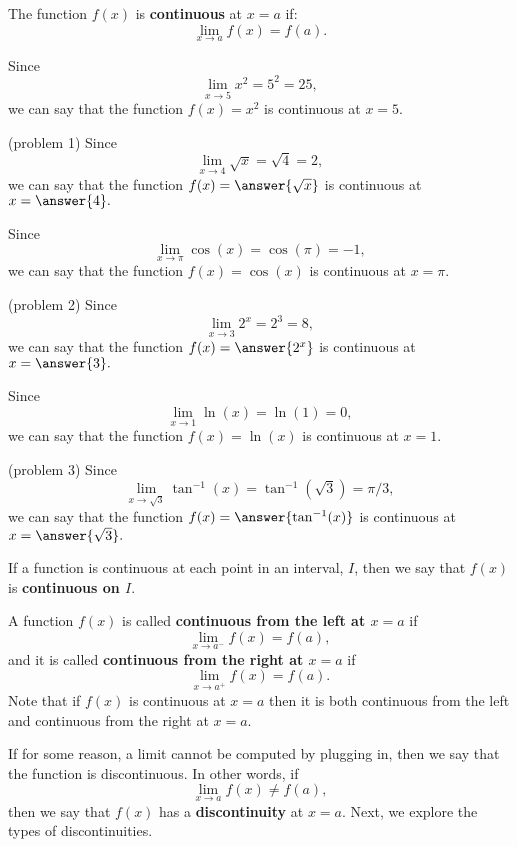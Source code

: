 \documentclass{ximera}
\begin{document}
\begin{definition}[Continuity]
The function $f(x)$ is \textbf{continuous} at $x = a$ if:
\[\lim_{x \to a} f(x) = f(a).\]
\end{definition}

\begin{example}[example 1]
Since
\[\lim_{x \to 5} x^2 = 5^2 = 25,\]
we can say that the function $f(x) = x^2$ is continuous at $x = 5$.
\end{example}

\begin{problem}(problem 1)
Since
\[\lim_{x \to 4} \sqrt{x} = \sqrt{4} = 2,\]
we can say that the function
$f(x) = \answer{\sqrt x}$
is continuous at
$x = \answer{4}.$
\end{problem}


\begin{example}[example 2]
Since
\[\lim_{x \to \pi} \cos(x) = \cos(\pi) = -1,\]
we can say that the function $f(x) = \cos(x)$ is continuous at $x = \pi$.
\end{example}

\begin{problem}(problem 2)
Since
\[\lim_{x \to 3} 2^x = 2^3 = 8,\]
we can say that the function
$f(x) = \answer{2^x}$
is continuous at
$x = \answer{3}.$
\end{problem}

\begin{example}[example 3]
Since
\[\lim_{x \to 1} \ln(x) = \ln(1) = 0,\]
we can say that the function $f(x) = \ln(x)$ is continuous at $x = 1$.
\end{example}

\begin{problem}(problem 3)
Since
\[\lim_{x \to \sqrt 3} \tan^{-1}(x) = \tan^{-1}(\sqrt 3) = \pi/3,\]
we can say that the function
$f(x) = \answer{\tan^{-1}(x)}$
is continuous at
$x = \answer{\sqrt 3}.$
\end{problem}

If a function is continuous at each point in an interval, $I$, then we say that $f(x)$ is \textbf{continuous on $I$}.

A function $f(x)$ is called \textbf{continuous from the left at $x=a$} if 
\[\lim_{x \to a^-} f(x) = f(a),\]
and it is called \textbf{continuous from the right at $x = a$} if
\[\lim_{x \to a^+} f(x) = f(a).\]
Note that if $f(x)$ is continuous at $x=a$ then it is both continuous from the left and 
continuous from the right at $x = a$.

If for some reason, a limit cannot be computed by plugging in, then we say that the function is discontinuous.
In other words, if
\[\lim_{x \to a} f(x) \neq f(a),\]
then we say that $f(x)$ has a \textbf{discontinuity} at $x = a$.
Next, we explore the types of discontinuities.
\end{document}
